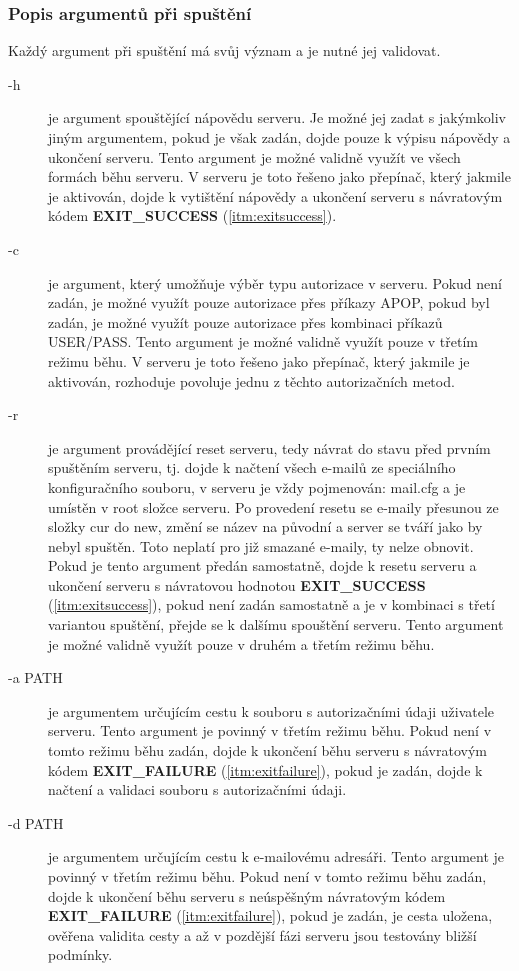 \documentclass[11pt,a4paper]{report}
\begin{document}
\subsubsection{Popis argumentů při spuštění}
Každý argument při spuštění má svůj význam a je nutné jej validovat. \par

\begin{description}
\item [-h] je argument spouštějící nápovědu serveru. Je možné jej zadat s jakýmkoliv jiným argumentem, pokud je však zadán, dojde pouze k výpisu nápovědy a ukončení serveru. Tento argument je možné validně využít ve všech formách běhu serveru.
V serveru je toto řešeno jako přepínač, který jakmile je aktivován, dojde k vytištění nápovědy a ukončení serveru s návratovým kódem \textbf{EXIT\_SUCCESS} (\ref{itm:exitsuccess}).
\item [-c] je argument, který umožňuje výběr typu autorizace v serveru. Pokud není zadán, je možné využít pouze autorizace přes příkazy APOP, pokud byl zadán, je možné využít pouze autorizace přes kombinaci příkazů USER/PASS. Tento argument je možné validně využít pouze v třetím režimu běhu.
V serveru je toto řešeno jako přepínač, který jakmile je aktivován, rozhoduje povoluje jednu z těchto autorizačních metod.
\item [-r] je argument provádějící reset serveru, tedy návrat do stavu před prvním spuštěním serveru, tj. dojde k načtení všech e-mailů ze speciálního konfiguračního souboru, v serveru je vždy pojmenován: mail.cfg a je umístěn v root složce serveru. Po provedení resetu se e-maily přesunou ze složky cur do new, změní se název na původní a server se tváří jako by nebyl spuštěn. Toto neplatí pro již smazané e-maily, ty nelze obnovit. Pokud je tento argument předán samostatně, dojde k resetu serveru a ukončení serveru s návratovou hodnotou \textbf{EXIT\_SUCCESS} (\ref{itm:exitsuccess}), pokud není zadán samostatně a je v kombinaci s třetí variantou spuštění, přejde se k dalšímu spouštění serveru. Tento argument je možné validně využít pouze v druhém a třetím režimu běhu.
\item [-a PATH] je argumentem určujícím cestu k souboru s autorizačními údaji uživatele serveru. Tento argument je povinný v třetím režimu běhu. Pokud není v tomto režimu běhu zadán, dojde k ukončení běhu serveru s návratovým kódem \textbf{EXIT\_FAILURE} (\ref{itm:exitfailure}), pokud je zadán, dojde k načtení a validaci souboru s autorizačními údaji.
\item [-d PATH] je argumentem určujícím cestu k e-mailovému adresáři. Tento argument je povinný v třetím režimu běhu. Pokud není v tomto režimu běhu zadán, dojde k ukončení běhu serveru s neúspěšným návratovým kódem \textbf{EXIT\_FAILURE} (\ref{itm:exitfailure}), pokud je zadán, je cesta uložena, ověřena validita cesty a až v pozdější fázi serveru jsou testovány bližší podmínky.

\end{description}
\end{document}
